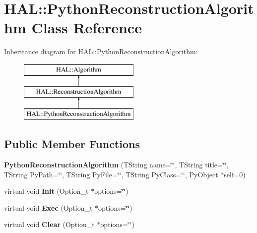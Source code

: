 \hypertarget{class_h_a_l_1_1_python_reconstruction_algorithm}{\section{H\-A\-L\-:\-:Python\-Reconstruction\-Algorithm Class Reference}
\label{class_h_a_l_1_1_python_reconstruction_algorithm}
}
Inheritance diagram for H\-A\-L\-:\-:Python\-Reconstruction\-Algorithm\-:\begin{figure}[H]
\begin{center}
\leavevmode
\includegraphics[height=3.000000cm]{class_h_a_l_1_1_python_reconstruction_algorithm}
\end{center}
\end{figure}
\subsection*{Public Member Functions}
\begin{DoxyCompactItemize}
\item 
\hypertarget{class_h_a_l_1_1_python_reconstruction_algorithm_a62fdc4403273df30ecd4cff5b09f5252}{{\bfseries Python\-Reconstruction\-Algorithm} (T\-String name=\char`\"{}\char`\"{}, T\-String title=\char`\"{}\char`\"{}, T\-String Py\-Path=\char`\"{}\char`\"{}, T\-String Py\-File=\char`\"{}\char`\"{}, T\-String Py\-Class=\char`\"{}\char`\"{}, Py\-Object $\ast$self=0)}\label{class_h_a_l_1_1_python_reconstruction_algorithm_a62fdc4403273df30ecd4cff5b09f5252}

\item 
\hypertarget{class_h_a_l_1_1_python_reconstruction_algorithm_aac27f846671212cdf0ca1e5dabb74f76}{virtual void {\bfseries Init} (Option\-\_\-t $\ast$options=\char`\"{}\char`\"{})}\label{class_h_a_l_1_1_python_reconstruction_algorithm_aac27f846671212cdf0ca1e5dabb74f76}

\item 
\hypertarget{class_h_a_l_1_1_python_reconstruction_algorithm_aebfd89f3b0fd586ad2bb224d5d84aa8f}{virtual void {\bfseries Exec} (Option\-\_\-t $\ast$options=\char`\"{}\char`\"{})}\label{class_h_a_l_1_1_python_reconstruction_algorithm_aebfd89f3b0fd586ad2bb224d5d84aa8f}

\item 
\hypertarget{class_h_a_l_1_1_python_reconstruction_algorithm_ab80718c499dcc01a8cca9f8894d92f87}{virtual void {\bfseries Clear} (Option\-\_\-t $\ast$options=\char`\"{}\char`\"{})}\label{class_h_a_l_1_1_python_reconstruction_algorithm_ab80718c499dcc01a8cca9f8894d92f87}

\end{DoxyCompactItemize}
